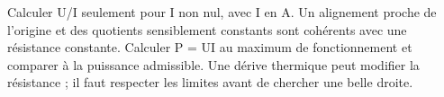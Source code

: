 \par\noindent\begin{minipage}{\linewidth}
\label{cor-activite-14}
Calculer U/I seulement pour I non nul, avec I en A. Un alignement proche de l’origine et des quotients sensiblement constants sont cohérents avec une résistance constante. Calculer P = UI au maximum de fonctionnement et comparer à la puissance admissible. Une dérive thermique peut modifier la résistance ; il faut respecter les limites avant de chercher une belle droite.\par\end{minipage}
